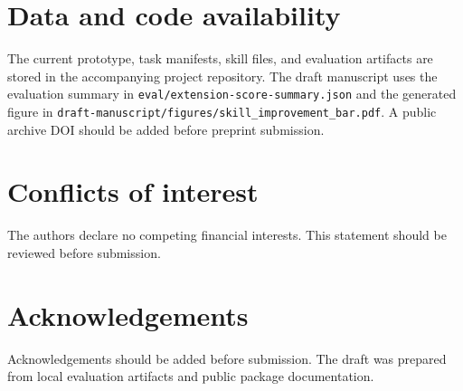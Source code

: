 \documentclass[11pt]{article}
\begin{document}
\section*{Data and code availability}

The current prototype, task manifests, skill files, and evaluation artifacts are stored in the accompanying project repository. The draft manuscript uses the evaluation summary in \texttt{eval/extension-score-summary.json} and the generated figure in \texttt{draft-manuscript/figures/skill\_improvement\_bar.pdf}. A public archive DOI should be added before preprint submission.

\section*{Conflicts of interest}

The authors declare no competing financial interests. This statement should be reviewed before submission.

\section*{Acknowledgements}

Acknowledgements should be added before submission. The draft was prepared from local evaluation artifacts and public package documentation.
\end{document}
